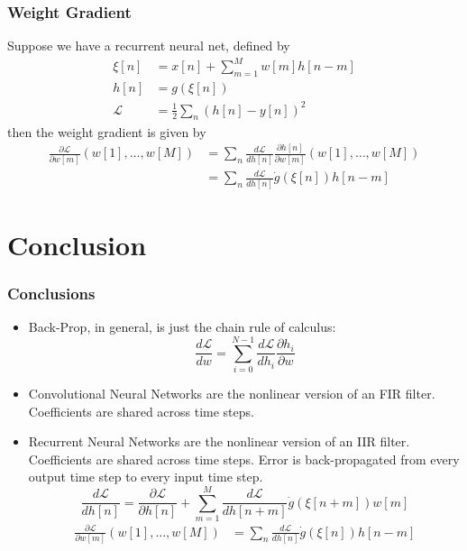 \documentclass{beamer}
\begin{document}
\begin{frame}
  \frametitle{Weight Gradient}
  Suppose we have a recurrent neural net, defined by
  \begin{align*}
    \xi[n] &= x[n] + \sum_{m=1}^{M}w[m] h[n-m]\\
    h[n] &= g\left(\xi[n]\right)\\
    {\mathcal L} &= \frac{1}{2}\sum_n\left(h[n]-y[n]\right)^2
  \end{align*}
  then the weight gradient is given by
  \begin{align*}
    \frac{\partial{\mathcal L}}{\partial w[m]}\left(w[1],\ldots,w[M]\right)
    &=\sum_{n}\frac{d{\mathcal L}}{d h[n]}\frac{\partial h[n]}{\partial w[m]}\left(w[1],\ldots,w[M]\right)\\
    &=\sum_{n}\frac{d{\mathcal L}}{dh[n]}\dot{g}(\xi[n]) h[n-m]
  \end{align*}
\end{frame}
  
\section{Conclusion}
\setcounter{subsection}{1}

\begin{frame}
  \frametitle{Conclusions}
  \begin{itemize}
  \item Back-Prop, in general, is just the chain rule of calculus:
    \begin{displaymath}
      \frac{d{\mathcal L}}{dw} = \sum_{i=0}^{N-1}\frac{d{\mathcal L}}{dh_i}\frac{\partial h_i}{\partial w}
    \end{displaymath}
  \item Convolutional Neural Networks are the nonlinear version of an FIR filter.
    Coefficients are shared across time steps.
  \item Recurrent Neural Networks are the nonlinear version of an IIR filter.  
    Coefficients are shared across time steps.
    Error is back-propagated from every output time step to every input time step.
    \begin{displaymath}
      \frac{d{\mathcal L}}{dh[n]}
      =\frac{\partial {\mathcal L}}{\partial h[n]}+
      \sum_{m=1}^{M}\frac{d{\mathcal L}}{dh[n+m]}\dot{g}(\xi[n+m])w[m]
    \end{displaymath}
    \begin{align*}
      \frac{\partial{\mathcal L}}{\partial w[m]}\left(w[1],\ldots,w[M]\right)
      &=\sum_{n}\frac{d{\mathcal L}}{dh[n]}\dot{g}(\xi[n]) h[n-m]
    \end{align*}
  \end{itemize}
\end{frame}
\end{document}
